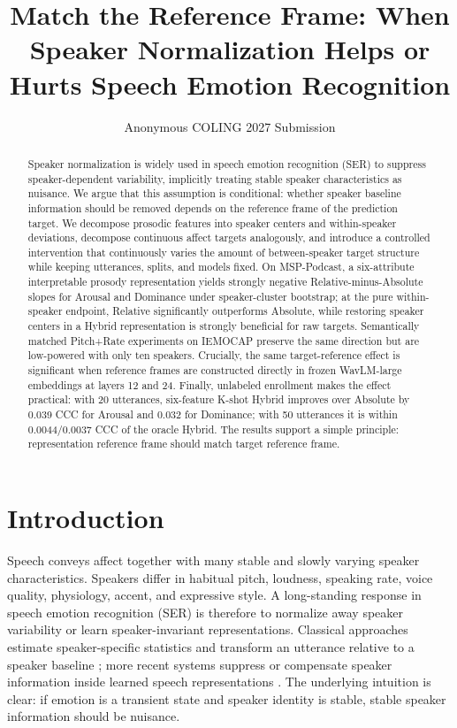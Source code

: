 \documentclass[11pt]{article}
\title{Match the Reference Frame: When Speaker Normalization Helps or Hurts Speech Emotion Recognition}
\author{Anonymous COLING 2027 Submission}
\begin{document}
\maketitle

\begin{abstract}
Speaker normalization is widely used in speech emotion recognition (SER) to suppress speaker-dependent variability, implicitly treating stable speaker characteristics as nuisance.
We argue that this assumption is conditional: whether speaker baseline information should be removed depends on the reference frame of the prediction target.
We decompose prosodic features into speaker centers and within-speaker deviations, decompose continuous affect targets analogously, and introduce a controlled intervention that continuously varies the amount of between-speaker target structure while keeping utterances, splits, and models fixed.
On MSP-Podcast, a six-attribute interpretable prosody representation yields strongly negative Relative-minus-Absolute slopes for Arousal and Dominance under speaker-cluster bootstrap; at the pure within-speaker endpoint, Relative significantly outperforms Absolute, while restoring speaker centers in a Hybrid representation is strongly beneficial for raw targets.
Semantically matched Pitch+Rate experiments on IEMOCAP preserve the same direction but are low-powered with only ten speakers.
Crucially, the same target-reference effect is significant when reference frames are constructed directly in frozen WavLM-large embeddings at layers 12 and 24.
Finally, unlabeled enrollment makes the effect practical: with 20 utterances, six-feature K-shot Hybrid improves over Absolute by 0.039 CCC for Arousal and 0.032 for Dominance; with 50 utterances it is within 0.0044/0.0037 CCC of the oracle Hybrid.
The results support a simple principle: representation reference frame should match target reference frame.
\end{abstract}

\section{Introduction}

Speech conveys affect together with many stable and slowly varying speaker characteristics.
Speakers differ in habitual pitch, loudness, speaking rate, voice quality, physiology, accent, and expressive style.
A long-standing response in speech emotion recognition (SER) is therefore to normalize away speaker variability or learn speaker-invariant representations.
Classical approaches estimate speaker-specific statistics and transform an utterance relative to a speaker baseline \citep{busso2013normalization,mariooryad2014compensating,bone2012arousal,bone2014arousal}; more recent systems suppress or compensate speaker information inside learned speech representations \citep{gat2022speaker}.
The underlying intuition is clear: if emotion is a transient state and speaker identity is stable, stable speaker information should be nuisance.
\end{document}
